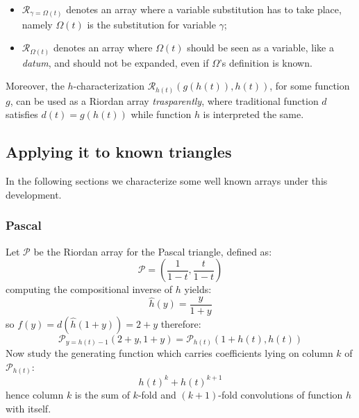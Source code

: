 \begin{itemize}
    \item $\mathcal{R}_{\gamma=\Omega(t)}$ denotes an array where a variable
        substitution has to take place, namely $\Omega(t)$ is the substitution 
        for variable $\gamma$;
    \item $\mathcal{R}_{\Omega(t)}$ denotes an array where $\Omega(t)$ should 
        be seen as a variable, like a \emph{datum}, and should not be expanded,
        even if $\Omega$'s definition is known. 
\end{itemize}

\label{par:h:characterization:is:an:array:polymorphism}
Moreover, the $h$-characterization $\mathcal{R}_{h(t)}\left(g(h(t)),h(t)\right)$,
for some function $g$, can be used as a Riordan array \emph{trasparently},
where traditional function $d$ satisfies $d(t) = g(h(t))$ while function $h$
is interpreted the same.


\subsection{Applying it to known triangles}

In the following sections we characterize some well known 
arrays under this development.

\subsubsection{Pascal}
Let $\mathcal{P}$ be the Riordan array for the Pascal triangle,
defined as:
\begin{displaymath} 
    \mathcal{P} = \left(\frac{1}{1-t}, \frac{t}{1-t}  \right)
\end{displaymath} 
computing the compositional inverse of $h$ yields:
\begin{displaymath} 
    \hat{h}(y) = \frac{y}{1+y}
\end{displaymath} 
so $f(y)=d(\hat{h}(1+y))=2+y$ therefore:
\begin{displaymath} 
    \mathcal{P}_{y=h(t)-1}\left( 2+y, 1+y \right)= \mathcal{P}_{h(t)}\left( 1+h(t), h(t) \right)
\end{displaymath} 
Now study the generating function which carries coefficients lying on column $k$
of $\mathcal{P}_{h(t)}$:
\begin{displaymath} 
    h(t)^k + h(t)^{k+1}
\end{displaymath} 
hence column $k$ is the sum of $k$-fold and $(k+1)$-fold convolutions 
of function $h$ with itself.

